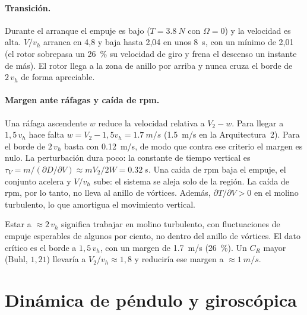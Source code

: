 \paragraph{Transición.} Durante el arranque el empuje es bajo ($T=\SI{3.8}{N}$ con
$\Omega=0$) y la velocidad es alta. $V/v_h$ arranca en 4,8 y baja hasta 2,04 en unos
\SI{8}{s}, con un mínimo de 2,01 (el rotor sobrepasa un \SI{26}{\percent} su velocidad de
giro y frena el descenso un instante de más). El rotor llega a la zona de anillo por arriba
y nunca cruza el borde de $2\,v_h$ de forma apreciable.

\paragraph{Margen ante ráfagas y caída de rpm.} Una ráfaga ascendente $w$ reduce la
velocidad relativa a $V_2-w$. Para llegar a $1{,}5\,v_h$ hace falta
$w=V_2-1{,}5v_h=\SI{1.7}{m/s}$ (\SI{1.5}{m/s} en la Arquitectura~2). Para el borde de
$2\,v_h$ basta con \SI{0.12}{m/s}, de modo que contra ese criterio el margen es nulo. La
perturbación dura poco: la constante de tiempo vertical es
$\tau_V=m/(\partial D/\partial V)\approx mV_2/2W=\SI{0.32}{s}$. Una
caída de rpm baja el empuje, el conjunto acelera y $V/v_h$ sube: el sistema se aleja
solo de la región. La caída de rpm, por lo tanto, no lleva al anillo de vórtices.
Además, $\partial T/\partial V>0$ en el molino turbulento, lo que amortigua el
movimiento vertical.

\begin{nota}[Interpretación]
Estar a $\approx2\,v_h$ significa trabajar en molino turbulento, con fluctuaciones de
empuje esperables de algunos por ciento, no dentro del anillo de vórtices. El dato
crítico es el borde a $1{,}5\,v_h$, con un margen de \SI{1.7}{m/s} (\SI{26}{\percent}).
Un $C_R$ mayor (Buhl, $1{,}21$) llevaría a $V_2/v_h\approx1{,}8$ y reduciría ese margen a
$\approx\SI{1}{m/s}$.
\end{nota}

\section{Dinámica de péndulo y giroscópica}\label{sec:estabilidad-pend}

